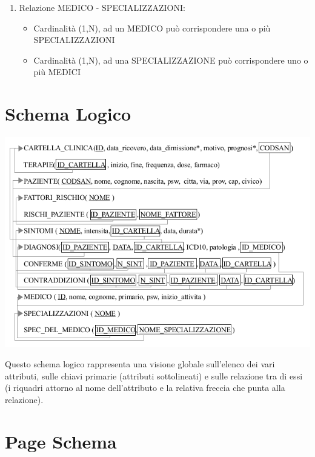 \documentclass[a4paper,titlepage]{article}
\begin{document}
\begin{enumerate}
\item Relazione MEDICO - SPECIALIZZAZIONI:

\begin{itemize}[leftmargin=0.5cm, topsep=0.25cm, itemsep=0.2cm]

\item Cardinalità (1,N), ad un MEDICO può corrispondere una o più SPECIALIZZAZIONI
\item Cardinalità (1,N), ad una SPECIALIZZAZIONE può corrispondere uno o più MEDICI

\end{itemize}

\end{enumerate}

\newpage

\part{Schema Logico}
    \begin{center}

    \centering
    \includegraphics[scale=0.9]{schema_logico.png}

    \end{center}

Questo schema logico rappresenta una visione globale sull'elenco dei vari attributi, sulle chiavi primarie (attributi sottolineati) e sulle relazione tra di essi (i riquadri attorno al nome dell'attributo e la relativa freccia che punta alla relazione).
\newpage
\part{Page Schema}
\end{document}

